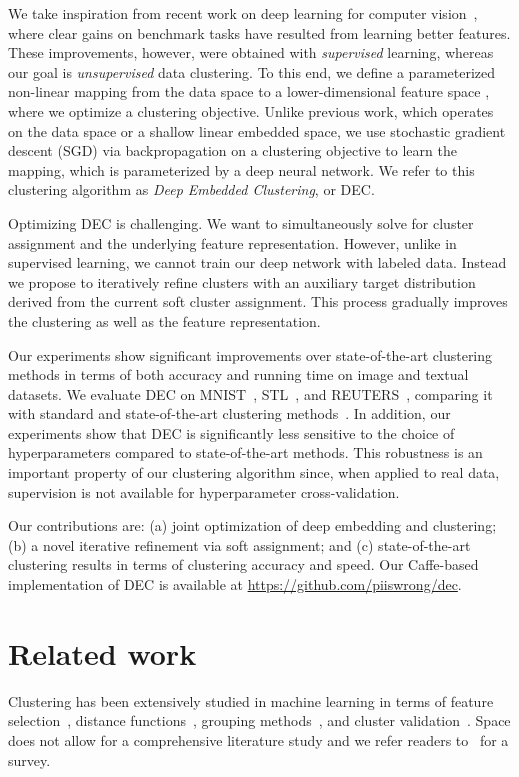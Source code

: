 \documentclass{article}
\begin{document}
We take inspiration from recent work on deep learning for computer vision~\citep{krizhevsky2012imagenet,girshick2014rich,zeiler2014visualizing,long2014fully}, where clear gains on benchmark tasks have resulted from learning better features.
These improvements, however, were obtained with \emph{supervised} learning, whereas our goal is \emph{unsupervised} data clustering.
To this end, we define a parameterized non-linear mapping from the data space  to a lower-dimensional feature space , where we optimize a clustering objective.
Unlike previous work, which operates on the data space or a shallow linear embedded space, we use stochastic gradient descent (SGD) via backpropagation on a clustering objective to learn the mapping, which is parameterized by a deep neural network.
We refer to this clustering algorithm as \emph{Deep Embedded Clustering}, or DEC.

Optimizing DEC is challenging.
We want to simultaneously solve for cluster assignment and the underlying feature representation.
However, unlike in supervised learning, we cannot train our deep network with labeled data.
Instead we propose to iteratively refine clusters with an auxiliary target distribution derived from the current soft cluster assignment.
This process gradually improves the clustering as well as the feature representation.

Our experiments show significant improvements over state-of-the-art clustering methods in terms of both accuracy and running time on image and textual datasets.
We evaluate DEC on MNIST~\citep{lecun1998gradient}, STL~\citep{coates2011analysis}, and REUTERS~\citep{lewis2004rcv1}, comparing it with standard and state-of-the-art clustering methods~\citep{nie2011spectral,yang2010image}.
In addition, our experiments show that DEC is significantly less sensitive to the choice of hyperparameters compared to state-of-the-art methods.
This robustness is an important property of our clustering algorithm since, when applied to real data, supervision is not available for hyperparameter cross-validation. 

Our contributions are:
(a) joint optimization of deep embedding and clustering;
(b) a novel iterative refinement via soft assignment;
and (c) state-of-the-art clustering results in terms of clustering accuracy and
speed.
Our Caffe-based~\citep{jia2014caffe} implementation of DEC is available at \url{https://github.com/piiswrong/dec}.

 \section{Related work}
Clustering has been extensively studied in machine learning in terms of feature selection~\citep{boutsidis2009unsupervised,liu2005toward,alelyani2013feature}, distance functions~\citep{xing2002distance,xiang2008learning}, grouping methods~\citep{macqueen1967some,von2007tutorial,li2004entropy}, and cluster validation~\citep{halkidi2001clustering}.
Space does not allow for a comprehensive literature study and we refer readers to~\citep{aggarwal2013data} for a survey.
\end{document}
